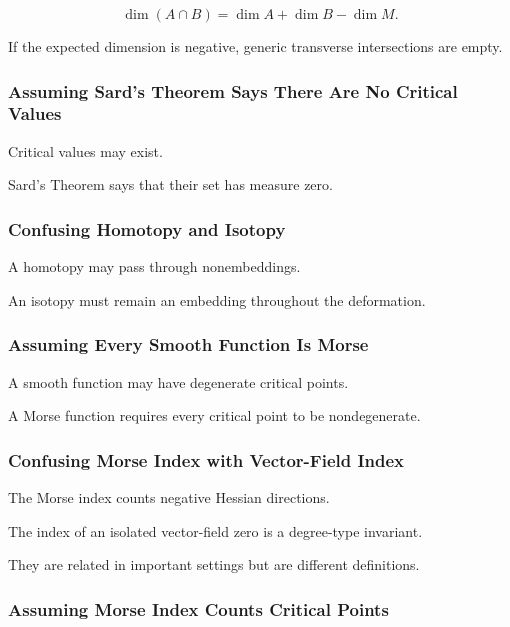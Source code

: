 \[
\dim(A\cap B)
=
\dim A+\dim B-\dim M.
\]

If the expected dimension is negative, generic transverse intersections are
empty.

\subsubsection{Assuming Sard's Theorem Says There Are No Critical Values}

Critical values may exist.

Sard's Theorem says that their set has measure zero.

\subsubsection{Confusing Homotopy and Isotopy}

A homotopy may pass through nonembeddings.

An isotopy must remain an embedding throughout the deformation.

\subsubsection{Assuming Every Smooth Function Is Morse}

A smooth function may have degenerate critical points.

A Morse function requires every critical point to be nondegenerate.

\subsubsection{Confusing Morse Index with Vector-Field Index}

The Morse index counts negative Hessian directions.

The index of an isolated vector-field zero is a degree-type invariant.

They are related in important settings but are different definitions.

\subsubsection{Assuming Morse Index Counts Critical Points}


